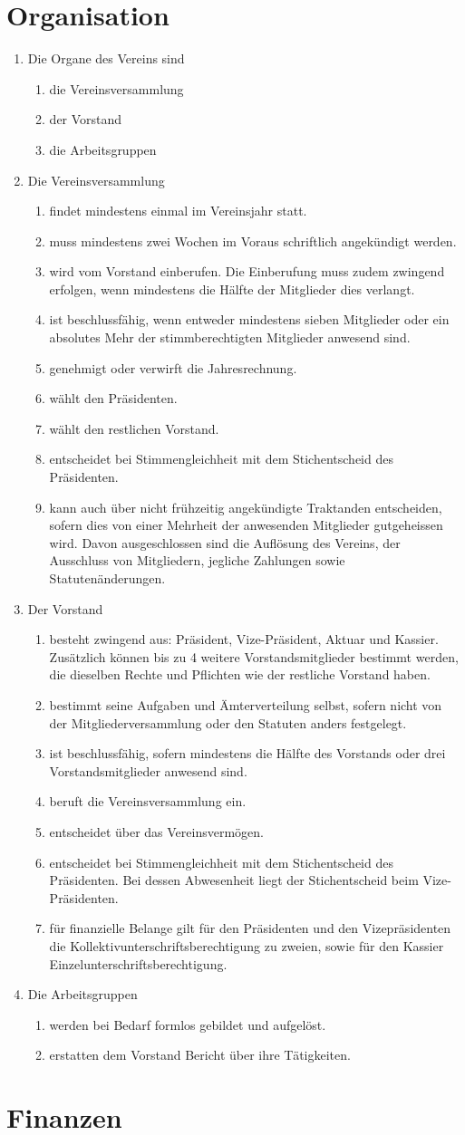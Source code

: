 \documentclass[10pt,a4paper,parskip,fleqn]{scrartcl}
\newcommand{\ol}{\begin{enumerate}[itemsep=-0.2em,topsep=-0.2em]}
\newcommand{\lo}{\end{enumerate}}
\newcommand{\li}{\item}
\begin{document}
\section{Organisation}

\ol
	\li Die Organe des Vereins sind
		\ol
			\li die Vereinsversammlung
			\li der Vorstand
			\li die Arbeitsgruppen
		\lo
	\li Die Vereinsversammlung
		\ol
			\li findet mindestens einmal im Vereinsjahr statt.
			\li muss mindestens zwei Wochen im Voraus schriftlich angekündigt werden.
			\li wird vom Vorstand einberufen. Die Einberufung muss zudem zwingend
			erfolgen, wenn mindestens die Hälfte der Mitglieder dies verlangt.
      \li ist beschlussfähig, wenn entweder mindestens sieben Mitglieder oder
      ein absolutes Mehr der stimmberechtigten Mitglieder anwesend sind.
			\li genehmigt oder verwirft die Jahresrechnung.
			\li wählt den Präsidenten.
			\li wählt den restlichen Vorstand.
			\li entscheidet bei Stimmengleichheit mit dem Stichentscheid des
			Präsidenten.
			\li kann auch über nicht frühzeitig angekündigte Traktanden entscheiden,
			sofern dies von einer Mehrheit der anwesenden Mitglieder gutgeheissen
			wird.  Davon ausgeschlossen sind die Auflösung des Vereins, der Ausschluss
			von Mitgliedern, jegliche Zahlungen sowie Statutenänderungen.
		\lo
	\li Der Vorstand
		\ol
			\li besteht zwingend aus: Präsident, Vize-Präsident, Aktuar und Kassier.
			Zusätzlich können bis zu 4 weitere Vorstandsmitglieder bestimmt werden,
			die dieselben Rechte und Pflichten wie der restliche Vorstand haben.
			\li bestimmt seine Aufgaben und Ämterverteilung selbst, sofern nicht von
			der Mitgliederversammlung oder den Statuten anders festgelegt.
			\li ist beschlussfähig, sofern mindestens die Hälfte des Vorstands oder
			drei Vorstandsmitglieder anwesend sind.
			\li beruft die Vereinsversammlung ein.
			\li entscheidet über das Vereinsvermögen.
			\li entscheidet bei Stimmengleichheit mit dem Stichentscheid des
			Präsidenten. Bei dessen Abwesenheit liegt der Stichentscheid beim
			Vize-Präsidenten.
			\li für finanzielle Belange gilt für den Präsidenten und den
			Vizepräsidenten die Kollektiv\-unterschriftsberechtigung zu zweien, sowie
			für den Kassier Einzelunterschriftsberechtigung.
		\lo
	\li Die Arbeitsgruppen
		\ol
			\li werden bei Bedarf formlos gebildet und aufgelöst.
			\li erstatten dem Vorstand Bericht über ihre Tätigkeiten.
		\lo
\lo


\section{Finanzen}
\end{document}
